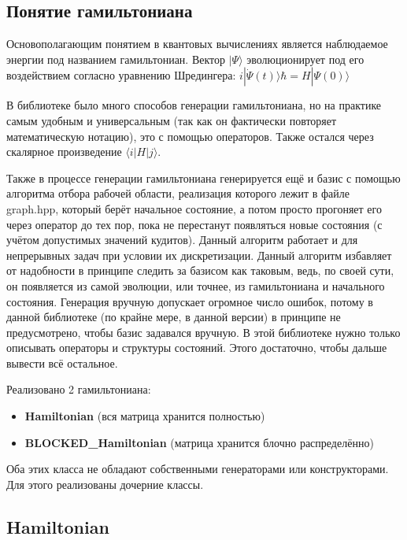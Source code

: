 \documentclass[12pt,fleqn]{article}
\begin{document}
        \subsection{Понятие гамильтониана}
        Основополагающим понятием в квантовых вычислениях является наблюдаемое энергии под названием гамильтониан. Вектор $|\Psi\rangle$ эволюционирует 
        под его воздействием согласно уравнению Шредингера: $i|\dot{\Psi}(t)\rangle\hbar = H|\Psi(0)\rangle$

        В библиотеке было много способов генерации гамильтониана, но на практике самым удобным и универсальным 
        (так как он фактически повторяет математическую нотацию), это с помощью операторов. Также остался через скалярное произведение $\langle{i}|H|j\rangle$.

        Также в процессе генерации гамильтониана генерируется ещё и базис с помощью \textsf{алгоритма отбора рабочей области}, реализация которого лежит в файле \textsf{graph.hpp},
        который берёт начальное состояние, а
        потом просто прогоняет его через оператор до тех пор, пока не перестанут появляться новые состояния (с учётом допустимых значений кудитов).
        Данный алгоритм работает и для непрерывных задач при условии их дискретизации.
        Данный алгоритм избавляет от надобности в принципе следить за базисом как таковым, ведь, по своей сути, он появляется из самой эволюции, или точнее, из гамильтониана и начального состояния.
        Генерация вручную допускает огромное число ошибок, потому в данной библиотеке (по крайне мере, в данной версии) в принципе не предусмотрено,
        чтобы базис задавался вручную. В этой библиотеке нужно только описывать операторы и структуры состояний. Этого достаточно, чтобы дальше вывести всё остальное.

        Реализовано 2 гамильтониана:
        \begin{itemize}
            \item{\textbf{Hamiltonian} (вся матрица хранится полностью)}
            \item{\textbf{BLOCKED\_Hamiltonian} (матрица хранится блочно распределённо)}
        \end{itemize}

        Оба этих класса не обладают собственными генераторами или конструкторами. Для этого реализованы дочерние классы.

        \subsection{\textbf{Hamiltonian}}
\end{document}
